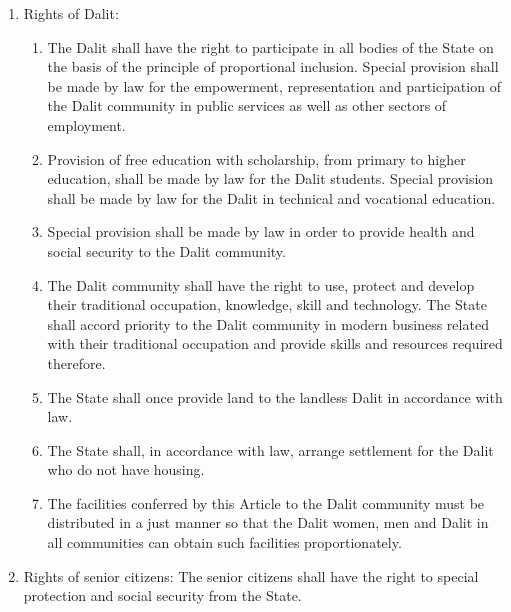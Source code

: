 \begin{questions}
\begin{solution}
\begin{enumerate}
\item Rights of Dalit:
\begin{enumerate}
    \item The Dalit shall have the right to participate in all bodies of the State on the basis of the principle of proportional inclusion. Special provision shall be made by law for the empowerment, representation and participation of the Dalit community in public services as well as other sectors of employment.
    \item Provision of free education with scholarship, from primary to higher education, shall be made by law for the Dalit students. Special provision shall be made by law for the Dalit in technical and vocational education.
    \item Special provision shall be made by law in order to provide health and social security to the Dalit community.
    \item The Dalit community shall have the right to use, protect and develop their traditional occupation, knowledge, skill and technology. The State shall accord priority to the Dalit community in modern business related with their traditional occupation and provide skills and resources required therefore.
    \item The State shall once provide land to the landless Dalit in accordance with law.
    \item The State shall, in accordance with law, arrange settlement for the Dalit who do not have housing.
    \item The facilities conferred by this Article to the Dalit community must be distributed in a just manner so that the Dalit women, men and Dalit in all communities can obtain such facilities proportionately.
\end{enumerate}

\item Rights of senior citizens: The senior citizens shall have the right to special protection and social security from the State.


\end{enumerate}
\end{solution}
\end{questions}

